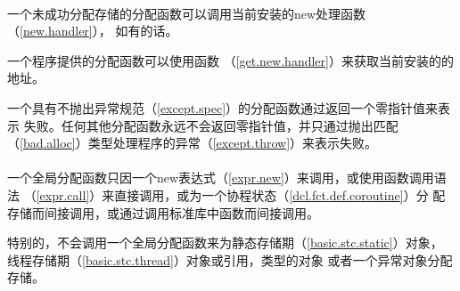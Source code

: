 \paragraph{} %
一个未成功分配存储的分配函数可以调用当前安装的new处理函数（\ref{new.handler}），
如有的话。

\begin{note}
  一个程序提供的分配函数可以使用函数
  （\ref{get.new.handler}）来获取当前安装的的地址。
\end{note}

一个具有不抛出异常规范（\ref{except.spec}）的分配函数通过返回一个零指针值来表示
失败。任何其他分配函数永远不会返回零指针值，并只通过抛出匹配
（\ref{bad.alloc}）类型处理程序的异常（\ref{except.throw}）来表示失败。

\paragraph{} %
一个全局分配函数只因一个new表达式（\ref{expr.new}）来调用，或使用函数调用语法
（\ref{expr.call}）来直接调用，或为一个协程状态（\ref{dcl.fct.def.coroutine}）分
配存储而间接调用，或通过调用\cpp{}标准库中函数而间接调用。

\begin{note}
  特别的，不会调用一个全局分配函数来为静态存储期（\ref{basic.stc.static}）对象，
  线程存储期（\ref{basic.stc.thread}）对象或引用，类型的对象
  或者一个异常对象分配存储。
\end{note}
